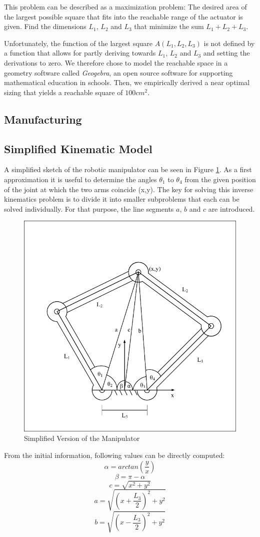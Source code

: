 \documentclass{sig-alternate-05-2015}
\begin{document}
This problem can be described as a maximization problem:
 The desired area of the largest possible square that fits into the reachable range of the actuator is given. Find the dimensions $L_1$, $L_2$ and $L_3$ that minimize the sum $L_1 + L_2 +L_3$.
 
 Unfortunately, the function of the largest square $A(L_1, L_2, L_3)$ is not defined by a function that allows for partly deriving towards $L_1$, $L_2$ and $L_3$ and setting the derivations to zero. 
 We therefore chose to model the reachable space in a geometry software called \emph{Geogebra}, an open source software for supporting mathematical education in schools. Then, we empirically derived a near optimal sizing that yields a reachable square of $100 cm^2$.
\subsection{Manufacturing}
\subsection{Simplified Kinematic Model}\label{section1}

A simplified sketch of the robotic manipulator can be seen in Figure \ref{fig:model}.
As a first approximation it is useful to determine the angles $\theta_1$ to $\theta_4$ from the given position of the joint at which the two arms coincide (x,y). The key for solving this inverse kinematics problem is to divide it into smaller subproblems that each can be solved individually. For that purpose, the line segments $a$, $b$ and $c$ are introduced.
\begin{figure}[!h]
	\label{fig:model}
	\centering
	\includegraphics[width=.42\textwidth]{LinkDiagramSimple_try.pdf}
	\caption{Simplified Version of the Manipulator}
\end{figure}

From the initial information, following values can be directly computed:
\begin{equation}
\alpha = arctan \left( \frac{y}{x} \right)
\end{equation}
\begin{equation}
\beta = \pi - \alpha
\end{equation}
\begin{equation}
c = \sqrt{x^2 + y^2}
\end{equation}
\begin{equation}
a = \sqrt{\left(x+ \frac{L_3}{2}\right)^2 + y^2}
\end{equation}
\begin{equation}
b = \sqrt{\left(x- \frac{L_3}{2}\right)^2 + y^2}
\end{equation}
\end{document}
